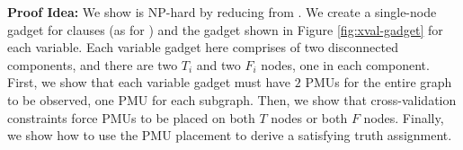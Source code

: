 %
%

%

{\bf Proof Idea:}   We show \xval is NP-hard by reducing from \sats.  
We create a single-node gadget for clauses (as for \fulls) and the gadget shown in Figure \ref{fig:xval-gadget} for each variable. Each variable gadget here comprises of two disconnected components, 
and there are two $T_i$ and two $F_i$ nodes, one in each component. First, we show that each variable gadget must have $2$ PMUs for the entire graph to be observed, one PMU for each subgraph.
Then, we show that cross-validation constraints force PMUs to be placed on both $T$ nodes or both $F$ nodes.  Finally, we show how to use the PMU placement to derive a satisfying \sat truth assignment.
 
